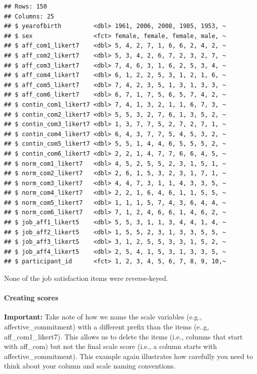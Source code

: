 \documentclass[
]{krantz}
\begin{document}
\begin{verbatim}
## Rows: 150
## Columns: 25
## $ yearofbirth         <dbl> 1961, 2006, 2008, 1985, 1953, ~
## $ sex                 <fct> female, female, female, male, ~
## $ aff_com1_likert7    <dbl> 5, 4, 2, 7, 1, 6, 6, 2, 4, 2, ~
## $ aff_com2_likert7    <dbl> 5, 3, 4, 2, 6, 7, 2, 3, 2, 7, ~
## $ aff_com3_likert7    <dbl> 7, 4, 6, 3, 1, 6, 2, 5, 3, 4, ~
## $ aff_com4_likert7    <dbl> 6, 1, 2, 2, 5, 3, 1, 2, 1, 6, ~
## $ aff_com5_likert7    <dbl> 7, 4, 2, 3, 5, 1, 3, 1, 3, 3, ~
## $ aff_com6_likert7    <dbl> 6, 7, 1, 7, 5, 6, 5, 7, 4, 2, ~
## $ contin_com1_likert7 <dbl> 7, 4, 1, 3, 2, 1, 1, 6, 7, 3, ~
## $ contin_com2_likert7 <dbl> 5, 5, 3, 2, 7, 6, 1, 3, 5, 2, ~
## $ contin_com3_likert7 <dbl> 1, 3, 7, 7, 5, 2, 7, 2, 7, 1, ~
## $ contin_com4_likert7 <dbl> 6, 4, 3, 7, 7, 5, 4, 5, 3, 2, ~
## $ contin_com5_likert7 <dbl> 5, 5, 1, 4, 4, 6, 5, 5, 5, 2, ~
## $ contin_com6_likert7 <dbl> 2, 2, 1, 4, 7, 7, 6, 6, 4, 5, ~
## $ norm_com1_likert7   <dbl> 4, 5, 2, 5, 5, 2, 3, 1, 5, 1, ~
## $ norm_com2_likert7   <dbl> 2, 6, 1, 5, 3, 2, 3, 1, 7, 1, ~
## $ norm_com3_likert7   <dbl> 4, 4, 7, 3, 1, 1, 4, 3, 3, 5, ~
## $ norm_com4_likert7   <dbl> 2, 2, 1, 6, 4, 6, 1, 1, 5, 5, ~
## $ norm_com5_likert7   <dbl> 1, 1, 1, 5, 7, 4, 3, 6, 4, 4, ~
## $ norm_com6_likert7   <dbl> 7, 1, 2, 4, 6, 6, 1, 4, 6, 2, ~
## $ job_aff1_likert5    <dbl> 5, 5, 3, 1, 1, 3, 4, 4, 1, 4, ~
## $ job_aff2_likert5    <dbl> 1, 5, 5, 2, 3, 1, 3, 3, 5, 5, ~
## $ job_aff3_likert5    <dbl> 3, 1, 2, 5, 5, 3, 3, 1, 5, 2, ~
## $ job_aff4_likert5    <dbl> 2, 5, 4, 1, 5, 3, 1, 3, 3, 5, ~
## $ participant_id      <fct> 1, 2, 3, 4, 5, 6, 7, 8, 9, 10,~
\end{verbatim}

None of the job satisfaction items were reverse-keyed.

\hypertarget{creating-scores-1}{%
\paragraph{Creating scores}\label{creating-scores-1}}

\textbf{Important:} Take note of how we name the scale variables (e.g., affective\_commitment) with a different prefix than the items (e..g, aff\_com1\_likert7). This allows us to delete the items (i.e., columns that start with aff\_com) but not the final scale score (i.e., a column starts with affective\_commitment). This example again illustrates how carefully you need to think about your column and scale naming conventions.
\end{document}
